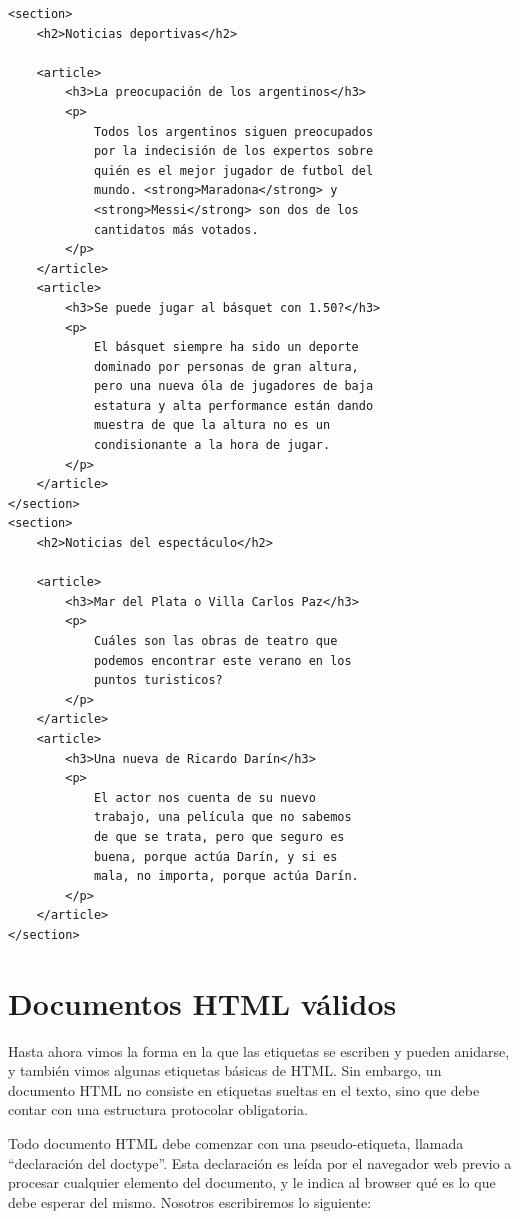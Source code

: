 \begin{lstlisting}[language=XHTML]
<section>
    <h2>Noticias deportivas</h2>

    <article>
        <h3>La preocupación de los argentinos</h3>
        <p>
            Todos los argentinos siguen preocupados
            por la indecisión de los expertos sobre
            quién es el mejor jugador de futbol del
            mundo. <strong>Maradona</strong> y
            <strong>Messi</strong> son dos de los
            cantidatos más votados.
        </p>
    </article>
    <article>
        <h3>Se puede jugar al básquet con 1.50?</h3>
        <p>
            El básquet siempre ha sido un deporte
            dominado por personas de gran altura,
            pero una nueva óla de jugadores de baja
            estatura y alta performance están dando
            muestra de que la altura no es un
            condisionante a la hora de jugar.
        </p>
    </article>
</section>
<section>
    <h2>Noticias del espectáculo</h2>

    <article>
        <h3>Mar del Plata o Villa Carlos Paz</h3>
        <p>
            Cuáles son las obras de teatro que
            podemos encontrar este verano en los
            puntos turisticos?
        </p>
    </article>
    <article>
        <h3>Una nueva de Ricardo Darín</h3>
        <p>
            El actor nos cuenta de su nuevo
            trabajo, una película que no sabemos
            de que se trata, pero que seguro es
            buena, porque actúa Darín, y si es
            mala, no importa, porque actúa Darín.
        </p>
    </article>
</section>
\end{lstlisting}

\section{Documentos HTML válidos}

Hasta ahora vimos la forma en la que las etiquetas se escriben y pueden anidarse,
y también vimos algunas etiquetas básicas de HTML. Sin embargo, un documento
HTML no consiste en etiquetas sueltas en el texto, sino que debe contar con
una estructura protocolar obligatoria.

Todo documento HTML debe comenzar con una pseudo-etiqueta, llamada ``declaración
del doctype''. Esta declaración es leída por el navegador web previo a procesar
cualquier elemento del documento, y le indica al browser qué es lo que debe
esperar del mismo. Nosotros escribiremos lo siguiente:

